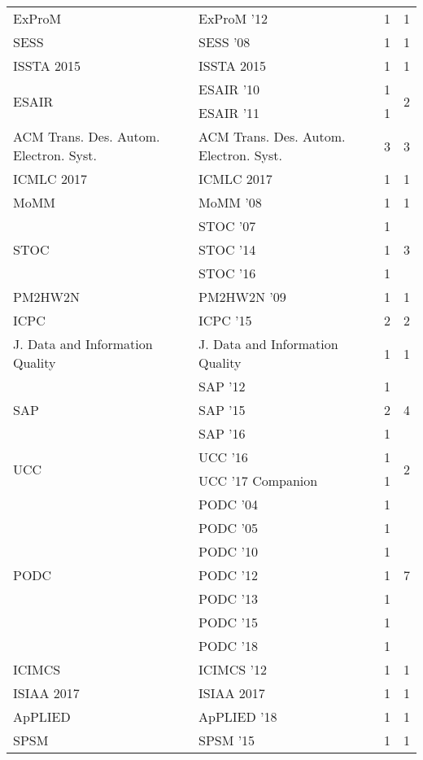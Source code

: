 \begin{table*}[t]
\begin{tabular}{llrr}
\multirow{1}{*}{ExProM } & ExProM '12 & 1 & \multirow{1}{*}{1}\\
\multirow{1}{*}{SESS } & SESS '08 & 1 & \multirow{1}{*}{1}\\
\multirow{1}{*}{ISSTA 2015} & ISSTA 2015 & 1 & \multirow{1}{*}{1}\\
\multirow{2}{*}{ESAIR } & ESAIR '10 & 1 & \multirow{2}{*}{2}\\
& ESAIR '11 & 1 &\\
\multirow{1}{*}{ACM Trans. Des. Autom. Electron. Syst.} & ACM Trans. Des. Autom. Electron. Syst. & 3 & \multirow{1}{*}{3}\\
\multirow{1}{*}{ICMLC 2017} & ICMLC 2017 & 1 & \multirow{1}{*}{1}\\
\multirow{1}{*}{MoMM } & MoMM '08 & 1 & \multirow{1}{*}{1}\\
\multirow{3}{*}{STOC } & STOC '07 & 1 & \multirow{3}{*}{3}\\
& STOC '14 & 1 &\\
& STOC '16 & 1 &\\
\multirow{1}{*}{PM2HW2N } & PM2HW2N '09 & 1 & \multirow{1}{*}{1}\\
\multirow{1}{*}{ICPC } & ICPC '15 & 2 & \multirow{1}{*}{2}\\
\multirow{1}{*}{J. Data and Information Quality} & J. Data and Information Quality & 1 & \multirow{1}{*}{1}\\
\multirow{3}{*}{SAP } & SAP '12 & 1 & \multirow{3}{*}{4}\\
& SAP '15 & 2 &\\
& SAP '16 & 1 &\\
\multirow{2}{*}{UCC } & UCC '16 & 1 & \multirow{2}{*}{2}\\
& UCC '17 Companion & 1 &\\
\multirow{7}{*}{PODC } & PODC '04 & 1 & \multirow{7}{*}{7}\\
& PODC '05 & 1 &\\
& PODC '10 & 1 &\\
& PODC '12 & 1 &\\
& PODC '13 & 1 &\\
& PODC '15 & 1 &\\
& PODC '18 & 1 &\\
\multirow{1}{*}{ICIMCS } & ICIMCS '12 & 1 & \multirow{1}{*}{1}\\
\multirow{1}{*}{ISIAA 2017} & ISIAA 2017 & 1 & \multirow{1}{*}{1}\\
\multirow{1}{*}{ApPLIED } & ApPLIED '18 & 1 & \multirow{1}{*}{1}\\
\multirow{1}{*}{SPSM } & SPSM '15 & 1 & \multirow{1}{*}{1}\\

\end{tabular}
\end{table*}
